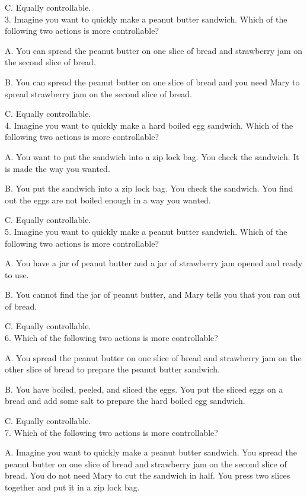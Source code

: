 \documentclass[12pt]{report}
\begin{document}
\begin{appendices}
C. Equally controllable.\\


3. Imagine you want to quickly make a peanut butter sandwich. Which of the following two actions is more controllable?

A. You can spread the peanut butter on one slice of bread and strawberry jam on the second slice of bread.

B. You can spread the peanut butter on one slice of bread and you need Mary to spread strawberry jam on the second slice of bread.

C. Equally controllable.\\


4. Imagine you want to quickly make a hard boiled egg sandwich. Which of the following two actions is more controllable?

A. You want to put the sandwich into a zip lock bag. You check the sandwich. It is made the way you wanted.

B. You put the sandwich into a zip lock bag. You check the sandwich. You find out the eggs are not boiled enough in a way you wanted.

C. Equally controllable.\\


5. Imagine you want to quickly make a peanut butter sandwich. Which of the following two actions is more controllable?

A. You have a jar of peanut butter and a jar of strawberry jam opened and ready to use.

B. You cannot find the jar of peanut butter, and Mary tells you that you ran out of bread.

C. Equally controllable.\\


6. Which of the following two actions is more controllable? 

A. You spread the peanut butter on one slice of bread and strawberry jam on the other slice of bread to prepare the peanut butter sandwich.

B. You have boiled, peeled, and sliced the eggs. You put the sliced eggs on a bread and add some salt to prepare the hard boiled egg sandwich.

C. Equally controllable.\\


7. Which of the following two actions is more controllable?

A. Imagine you want to quickly make a peanut butter sandwich. You spread the peanut butter on one slice of bread and strawberry jam on the second slice of bread. You do not need Mary to cut the sandwich in half. You press two slices together and put it in a zip lock bag.


\end{appendices}
\end{document}
